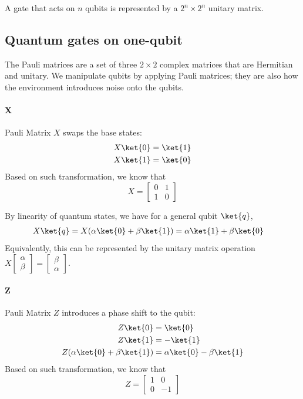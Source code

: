 A gate that acts on \(n\) qubits is represented by a \(2^n \times 2^n\) unitary matrix. 

\subsection{Quantum gates on one-qubit}
The Pauli matrices are a set of three \(2 \times 2\) complex matrices that are Hermitian and unitary. We manipulate qubits by applying Pauli matrices; they are also how the environment introduces noise onto the qubits. 

\paragraph{X} 
Pauli Matrix \(X\) swaps the base states:
\begin{align*}
    X \ket{0} &= \ket{1} \\
    X \ket{1} &= \ket{0} 
\end{align*}
Based on such transformation, we know that 
$$X = \begin{bmatrix}
    0 & 1 \\
    1 & 0 
\end{bmatrix}$$

By linearity of quantum states, we have for a general qubit \(\ket{q}\), 
\begin{align*}
    X \ket{q} = X (\alpha \ket{0} + \beta \ket{1}) &= \alpha \ket{1} + \beta \ket{0}
\end{align*}
Equivalently, this can be represented by the unitary matrix operation \(X\begin{bmatrix}
           \alpha \\
           \beta 
    \end{bmatrix} = \begin{bmatrix}
           \beta \\
           \alpha 
    \end{bmatrix} 
    \).
\paragraph{Z} 
Pauli Matrix \(Z\) introduces a phase shift to the qubit:
\begin{align*}
    Z \ket{0} &= \ket{0} \\
    Z \ket{1} &= -\ket{1} \\
    Z (\alpha \ket{0} + \beta \ket{1}) &= \alpha \ket{0} - \beta \ket{1}
\end{align*}
Based on such transformation, we know that 
$$Z = \begin{bmatrix}
    1 & 0 \\
    0 & -1 
\end{bmatrix}$$

